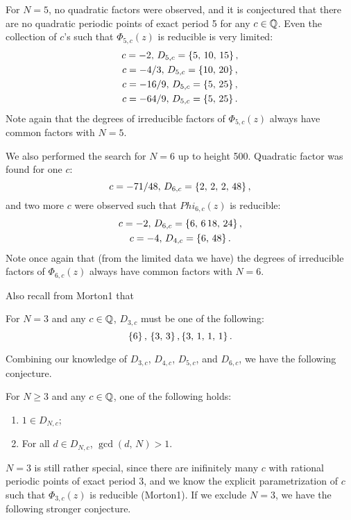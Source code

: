 For $N=5$, no quadratic factors were observed, and it is conjectured
that there are no quadratic periodic points of exact period 5 for any
$c \in \mathbb{Q}$. Even the collection of $c$'s such that $\Phi_{5,c}(z)$ is
reducible is very limited:
\[
\begin{gathered}
  c = -2,\, D_{5,c} = \left\{5,\, 10,\, 15\right\},\\
  c = -4/3,\, D_{5,c} = \left\{10,\, 20\right\},\\
  c = -16/9,\, D_{5,c} = \left\{5,\, 25\right\},\\
  c = -64/9,\, D_{5,c} = \left\{5,\, 25\right\}.
\end{gathered}
\]
Note again that the degrees of irreducible factors of $\Phi_{5,c}(z)$ always have common
factors with $N = 5$.

We also performed the search for $N = 6$ up to height 500. Quadratic
factor was found for one $c$:
\[
c = -71/48,\, D_{6,c} = \left\{2,\, 2,\, 2,\, 48\right\},
\]
and two more $c$ were observed such that $Phi_{6,c}(z)$ is reducible:
\[
\begin{gathered}
  c = -2,\, D_{6,c} = \left\{6,\, 6\, 18,\, 24\right\},\\
  c = -4,\, D_{4,c} = \left\{6,\, 48\right\}.
\end{gathered}
\]
Note once again that (from the limited data we have) the degrees of
irreducible factors of $\Phi_{6,c}(z)$ always have common factors with
$N = 6$.

Also recall from Morton1 that
\begin{theorem}
  For $N = 3$ and any $c \in \mathbb{Q}$, $D_{3, c}$ must be one of the
  following:
  \[
  \left\{6\right\},\, \left\{3,\, 3\right\}, \left\{3,\, 1,\, 1,\, 1\right\}.
  \]
\end{theorem}

Combining our knowledge of $D_{3,c}$, $D_{4,c}$, $D_{5,c}$, and
$D_{6,c}$, we have the following conjecture.

\begin{conjecture}
  For $N \ge 3$ and any $c \in \mathbb{Q}$, one of the following holds:
  \begin{enumerate}
  \item $1 \in D_{N,c}$;
  \item For all $d \in D_{N,c}$, $\gcd(d,\, N) > 1$.
  \end{enumerate}
\end{conjecture}

$N = 3$ is still rather special, since there are inifinitely many $c$
with rational periodic points of exact period 3, and we know the
explicit parametrization of $c$ such that $\Phi_{3,c}(z)$ is
reducible (Morton1). If we exclude $N = 3$, we have the following
stronger conjecture.

